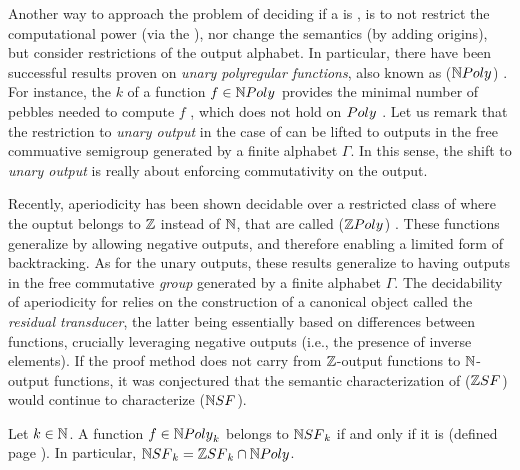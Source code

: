Another way to approach the problem of deciding if a 
is , is to not restrict the computational power (via the
), nor change the semantics (by adding origins), but consider
restrictions of the output alphabet. In particular, there have been successful
results proven on \emph{unary polyregular functions}, also known as
 ($\NPoly$)
\cite{doueneau2021pebble,doueneau2022hiding}. For instance, the  $k$ of a function $f \in \NPoly$ provides the minimal number of pebbles
needed to compute $f$ \cite{doueneau2021pebble}, which does not hold on $\Poly$
\cite{bojanczyk2022transducers}. Let us remark that the restriction to
\emph{unary output} in the case of  can be lifted to
outputs in the free commuative semigroup generated by a finite alphabet
$\Gamma$. In this sense, the shift to \emph{unary output} is really about
enforcing commutativity on the output.

Recently, aperiodicity has been shown decidable over a restricted class of
 where the ouptut belongs to $\mathbb{Z}$ instead of
$\mathbb{N}$, that are called  ($\ZPoly$)
\cite{LOPEZ23b}. These functions generalize 
by allowing negative outputs, and therefore enabling a limited form of
backtracking. As for the unary outputs, these results generalize to
 having outputs in the free commutative \emph{group}
generated by a finite alphabet $\Gamma$. The decidability of aperiodicity for
 relies on the construction of a canonical
object called the \emph{residual transducer}, the latter being essentially
based on differences between functions, crucially leveraging negative outputs
(i.e., the presence of inverse elements). If the proof method does not carry
from $\mathbb{Z}$-output functions to $\mathbb{N}$-output functions, it was conjectured
that the semantic characterization of  ($\ZSF$) would continue to characterize  ($\NSF$). 

\begin{conjecture}
    \label{zsf-nsf:conjecture}
    Let $k \in \mathbb{N}$.
    A function $f \in \NPoly[k]$
    belongs to $\NSF[k]$ if and only if
    it is  (defined page ).
    In particular,
    $\NSF[k] = \ZSF[k] \cap \NPoly$.
\end{conjecture}

